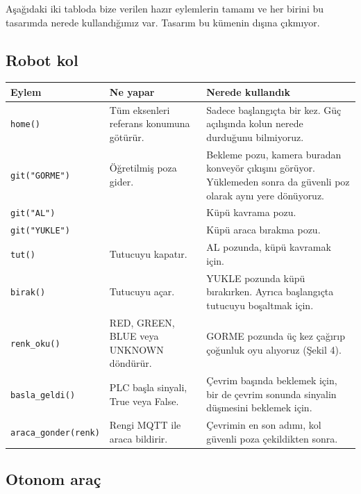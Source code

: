 \documentclass[11pt,a4paper]{article}
\newcommand{\ey}[1]{\texttt{#1}}
\begin{document}
Aşağıdaki iki tabloda bize verilen hazır eylemlerin tamamı ve her birini bu
tasarımda nerede kullandığımız var. Tasarım bu kümenin dışına çıkmıyor.

\subsection*{Robot kol}

\begin{longtable}{@{}p{3.4cm}p{4.1cm}p{7.2cm}@{}}
\toprule
\textbf{Eylem} & \textbf{Ne yapar} & \textbf{Nerede kullandık} \\
\midrule
\endhead
\ey{home()} & Tüm eksenleri referans konumuna götürür. &
Sadece başlangıçta bir kez. Güç açılışında kolun nerede durduğunu bilmiyoruz. \\
\addlinespace
\ey{git("GORME")} & Öğretilmiş poza gider. &
Bekleme pozu, kamera buradan konveyör çıkışını görüyor. Yüklemeden sonra da
güvenli poz olarak aynı yere dönüyoruz. \\
\addlinespace
\ey{git("AL")} & & Küpü kavrama pozu. \\
\addlinespace
\ey{git("YUKLE")} & & Küpü araca bırakma pozu. \\
\addlinespace
\ey{tut()} & Tutucuyu kapatır. & AL pozunda, küpü kavramak için. \\
\addlinespace
\ey{birak()} & Tutucuyu açar. &
YUKLE pozunda küpü bırakırken. Ayrıca başlangıçta tutucuyu boşaltmak için. \\
\addlinespace
\ey{renk\_oku()} & RED, GREEN, BLUE veya UNKNOWN döndürür. &
GORME pozunda üç kez çağırıp çoğunluk oyu alıyoruz (Şekil 4). \\
\addlinespace
\ey{basla\_geldi()} & PLC başla sinyali, True veya False. &
Çevrim başında beklemek için, bir de çevrim sonunda sinyalin düşmesini
beklemek için. \\
\addlinespace
\ey{araca\_gonder(renk)} & Rengi MQTT ile araca bildirir. &
Çevrimin en son adımı, kol güvenli poza çekildikten sonra. \\
\bottomrule
\end{longtable}

\subsection*{Otonom araç}
\end{document}
